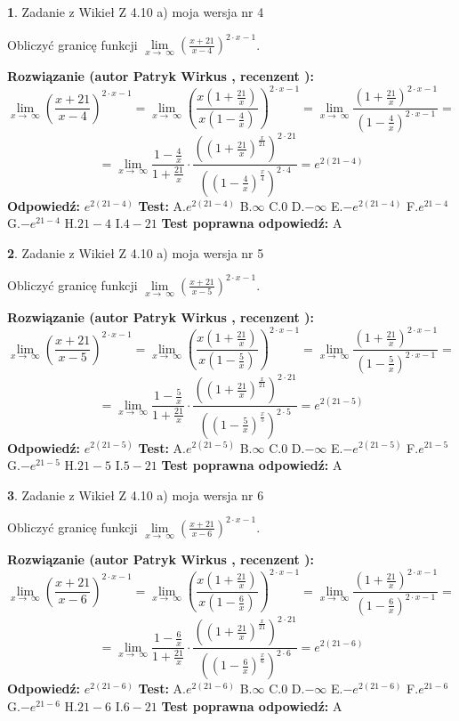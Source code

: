 \documentclass[12pt, a4paper]{article}
\theoremstyle{definition} %
\newtheorem{zad}{}
\newcommand{\zadStart}[1]{\begin{zad}#1\newline}
\newcommand{\zadStop}{\end{zad}}
\newcommand{\rozwStart}[2]{\noindent \textbf{Rozwiązanie (autor #1 , recenzent #2): }\newline}
\newcommand{\rozwStop}{\newline}
\newcommand{\odpStart}{\noindent \textbf{Odpowiedź:}\newline}
\newcommand{\odpStop}{\newline}
\newcommand{\testStart}{\noindent \textbf{Test:}\newline}
\newcommand{\testStop}{\newline}
\newcommand{\kluczStart}{\noindent \textbf{Test poprawna odpowiedź:}\newline}
\newcommand{\kluczStop}{\newline}
\begin{document}
\zadStart{Zadanie z Wikieł Z 4.10 a) moja wersja nr 4}


Obliczyć granicę funkcji  $\lim\limits_{x\to\ \infty}(\frac{x+21}{x-4})^{2\cdot x-1}$.
\zadStop
\rozwStart{Patryk Wirkus}{}
$$\lim\limits_{x\to\ \infty}(\frac{x+21}{x-4})^{2\cdot x-1} = \lim\limits_{x\to\ \infty}(\frac{x(1+\frac{21}{x})}{x(1-\frac{4}{x})})^{2\cdot x-1}=\lim\limits_{x\to\ \infty}\frac{(1+\frac{21}{x})^{2\cdot x-1}}{(1-\frac{4}{x})^{2\cdot x-1}}=$$
$$=\lim\limits_{x\to\ \infty}\frac{1-\frac{4}{x}}{1+\frac{21}{x}}\cdot\frac{((1+\frac{21}{x})^{\frac{x}{21}})^{2\cdot21}}{((1-\frac{4}{x})^{\frac{x}{4}})^{2\cdot4}}=e^{2(21-4)}$$
\rozwStop
\odpStart
$e^{2(21-4)}$
\odpStop
\testStart
A.$e^{2(21-4)}$ B.$\infty$ C.$0$ D.$-\infty$ E.$-e^{2(21-4)}$
F.$e^{21-4}$ G.$-e^{21-4}$
H.$21-4$
I.$4-21$
\testStop
\kluczStart
A
\kluczStop



\zadStart{Zadanie z Wikieł Z 4.10 a) moja wersja nr 5}


Obliczyć granicę funkcji  $\lim\limits_{x\to\ \infty}(\frac{x+21}{x-5})^{2\cdot x-1}$.
\zadStop
\rozwStart{Patryk Wirkus}{}
$$\lim\limits_{x\to\ \infty}(\frac{x+21}{x-5})^{2\cdot x-1} = \lim\limits_{x\to\ \infty}(\frac{x(1+\frac{21}{x})}{x(1-\frac{5}{x})})^{2\cdot x-1}=\lim\limits_{x\to\ \infty}\frac{(1+\frac{21}{x})^{2\cdot x-1}}{(1-\frac{5}{x})^{2\cdot x-1}}=$$
$$=\lim\limits_{x\to\ \infty}\frac{1-\frac{5}{x}}{1+\frac{21}{x}}\cdot\frac{((1+\frac{21}{x})^{\frac{x}{21}})^{2\cdot21}}{((1-\frac{5}{x})^{\frac{x}{5}})^{2\cdot5}}=e^{2(21-5)}$$
\rozwStop
\odpStart
$e^{2(21-5)}$
\odpStop
\testStart
A.$e^{2(21-5)}$ B.$\infty$ C.$0$ D.$-\infty$ E.$-e^{2(21-5)}$
F.$e^{21-5}$ G.$-e^{21-5}$
H.$21-5$
I.$5-21$
\testStop
\kluczStart
A
\kluczStop



\zadStart{Zadanie z Wikieł Z 4.10 a) moja wersja nr 6}


Obliczyć granicę funkcji  $\lim\limits_{x\to\ \infty}(\frac{x+21}{x-6})^{2\cdot x-1}$.
\zadStop
\rozwStart{Patryk Wirkus}{}
$$\lim\limits_{x\to\ \infty}(\frac{x+21}{x-6})^{2\cdot x-1} = \lim\limits_{x\to\ \infty}(\frac{x(1+\frac{21}{x})}{x(1-\frac{6}{x})})^{2\cdot x-1}=\lim\limits_{x\to\ \infty}\frac{(1+\frac{21}{x})^{2\cdot x-1}}{(1-\frac{6}{x})^{2\cdot x-1}}=$$
$$=\lim\limits_{x\to\ \infty}\frac{1-\frac{6}{x}}{1+\frac{21}{x}}\cdot\frac{((1+\frac{21}{x})^{\frac{x}{21}})^{2\cdot21}}{((1-\frac{6}{x})^{\frac{x}{6}})^{2\cdot6}}=e^{2(21-6)}$$
\rozwStop
\odpStart
$e^{2(21-6)}$
\odpStop
\testStart
A.$e^{2(21-6)}$ B.$\infty$ C.$0$ D.$-\infty$ E.$-e^{2(21-6)}$
F.$e^{21-6}$ G.$-e^{21-6}$
H.$21-6$
I.$6-21$
\testStop
\kluczStart
A
\kluczStop
\end{document}
